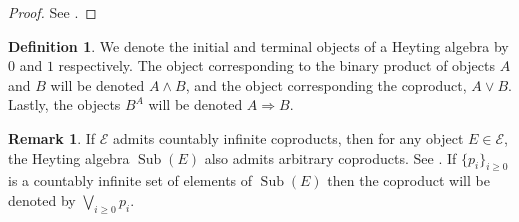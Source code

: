 \documentclass{birkjour}
\theoremstyle{plain}
\theoremstyle{definition}
\newtheorem{definition}[thm]{Definition} %
\newtheorem{remark}[thm]{Remark}
\newcommand{\call}[1]{\mathcal{#1}}
\begin{document}
	\begin{proof}
		See \cite[\S A1.4]{Johnstone}.
	\end{proof}
	\begin{definition}
		\label{heytingnotation}
		We denote the initial and terminal objects of a Heyting algebra by $0$ and $1$ respectively. The object corresponding to the binary product of objects $A$ and $B$ will be denoted $A \wedge B$, and the object corresponding the coproduct, $A \vee B$. Lastly, the objects $B^A$ will be denoted $A \Rightarrow B$.
	\end{definition}
	\begin{remark}
		\label{rmk:countable_colimits}
		If $\call{E}$ admits countably infinite coproducts, then for any object $E \in \call{E}$, the Heyting algebra $\operatorname{Sub}(E)$ also admits arbitrary coproducts. See \cite[\S A1.4]{Johnstone}. If $\lbrace p_i \rbrace_{i \geq 0}$ is a countably infinite set of elements of $\operatorname{Sub}(E)$ then the coproduct will be denoted by $\bigvee_{i\geq 0}p_i$.
	\end{remark}
\end{document}
